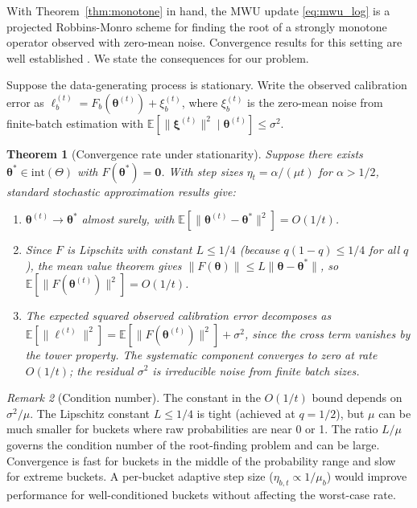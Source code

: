 \documentclass[12pt, letterpaper]{article}
\newtheorem{theorem}{Theorem}[section]
\theoremstyle{definition}
\theoremstyle{remark}
\newtheorem{remark}[theorem]{Remark}
\begin{document}
With Theorem~\ref{thm:monotone} in hand, the MWU update \eqref{eq:mwu_log} is a projected Robbins-Monro scheme for finding the root of a strongly monotone operator observed with zero-mean noise. Convergence results for this setting are well established \citep{polyak1992,nemirovski2009}. We state the consequences for our problem.

Suppose the data-generating process is stationary. Write the observed calibration error as $\ell_b^{(t)} = F_b(\boldsymbol{\theta}^{(t)}) + \xi_b^{(t)}$, where $\xi_b^{(t)}$ is the zero-mean noise from finite-batch estimation with $\mathbb{E}[\|\boldsymbol{\xi}^{(t)}\|^2 \mid \boldsymbol{\theta}^{(t)}] \le \sigma^2$.

\begin{theorem}[Convergence rate under stationarity]
\label{thm:convergence}
Suppose there exists $\boldsymbol{\theta}^* \in \mathrm{int}(\Theta)$ with $F(\boldsymbol{\theta}^*) = \mathbf{0}$. With step sizes $\eta_t = \alpha/(\mu t)$ for $\alpha > 1/2$, standard stochastic approximation results \citep[Theorem~2]{polyak1992} give:

\begin{enumerate}
\item[(a)] $\boldsymbol{\theta}^{(t)} \to \boldsymbol{\theta}^*$ almost surely, with $\mathbb{E}\!\left[\|\boldsymbol{\theta}^{(t)} - \boldsymbol{\theta}^*\|^2\right] = O(1/t)$.

\item[(b)] Since $F$ is Lipschitz with constant $L \le 1/4$ (because $q(1-q) \le 1/4$ for all $q$), the mean value theorem gives $\|F(\boldsymbol{\theta})\| \le L\|\boldsymbol{\theta} - \boldsymbol{\theta}^*\|$, so $\mathbb{E}\!\left[\|F(\boldsymbol{\theta}^{(t)})\|^2\right] = O(1/t)$.

\item[(c)] The expected squared observed calibration error decomposes as $\mathbb{E}\!\left[\|\boldsymbol{\ell}^{(t)}\|^2\right] = \mathbb{E}\!\left[\|F(\boldsymbol{\theta}^{(t)})\|^2\right] + \sigma^2$, since the cross term vanishes by the tower property. The systematic component converges to zero at rate $O(1/t)$; the residual $\sigma^2$ is irreducible noise from finite batch sizes.
\end{enumerate}
\end{theorem}

\begin{remark}[Condition number]
The constant in the $O(1/t)$ bound depends on $\sigma^2/\mu$. The Lipschitz constant $L \le 1/4$ is tight (achieved at $q = 1/2$), but $\mu$ can be much smaller for buckets where raw probabilities are near 0 or 1. The ratio $L/\mu$ governs the condition number of the root-finding problem and can be large. Convergence is fast for buckets in the middle of the probability range and slow for extreme buckets. A per-bucket adaptive step size ($\eta_{b,t} \propto 1/\mu_b$) would improve performance for well-conditioned buckets without affecting the worst-case rate.
\end{remark}
\end{document}
